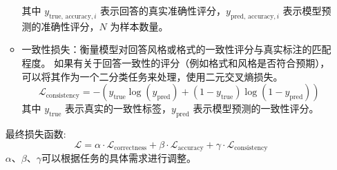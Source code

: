 \begin{itemize}
\begin{itemize}
\begin{equation}
                    \end{equation}
                    其中 \( y_{\text{true, accuracy}, i} \) 表示回答的真实准确性评分，\( y_{\text{pred, accuracy}, i} \) 表示模型预测的准确性评分，\( N \) 为样本数量。
              \item 一致性损失：衡量模型对回答风格或格式的一致性评分与真实标注的匹配程度。
                    如果有关于回答一致性的评分（例如格式和风格是否符合预期），可以将其作为一个二分类任务来处理，使用二元交叉熵损失。
                    \begin{equation}
                        \mathcal{L}_{\text{consistency}} = - \left( y_{\text{true}} \log(y_{\text{pred}}) + (1 - y_{\text{true}}) \log(1 - y_{\text{pred}}) \right)
                    \end{equation}
                    其中 \( y_{\text{true}} \) 表示真实的一致性标签，\( y_{\text{pred}} \) 表示模型预测的一致性评分。
          \end{itemize}
          最终损失函数:
          \begin{equation}
              \mathcal{L} = \alpha \cdot \mathcal{L}_{\text{correctness}} + \beta \cdot \mathcal{L}_{\text{accuracy}} + \gamma \cdot \mathcal{L}_{\text{consistency}}
          \end{equation}
          \(\alpha\)、\(\beta\)、\(\gamma\)可以根据任务的具体需求进行调整。
\end{itemize}
